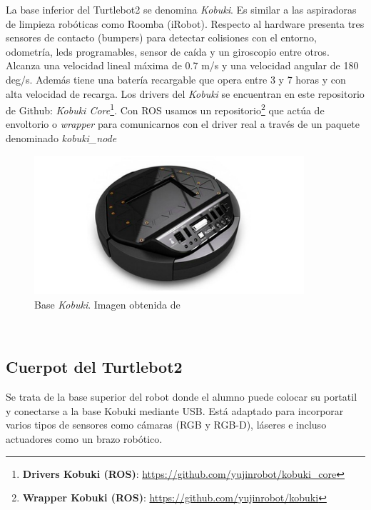 La base inferior del Turtlebot2 se denomina \textit{Kobuki}. Es similar a las aspiradoras de limpieza robóticas como Roomba (iRobot). Respecto al hardware presenta tres sensores de contacto (bumpers) para detectar colisiones con el entorno, odometría, leds programables, sensor de caída y un giroscopio entre otros. Alcanza una velocidad lineal máxima de 0.7 m/s y una velocidad angular de 180 deg/s. Además tiene una batería recargable que opera entre 3 y 7 horas y con alta velocidad de recarga. Los drivers del \textit{Kobuki} se encuentran en este repositorio de Github: \textit{Kobuki Core}\footnote{\textbf{Drivers Kobuki (ROS)}: \url{https://github.com/yujinrobot/kobuki_core}}. Con ROS usamos un repositorio\footnote{\textbf{Wrapper Kobuki (ROS)}: \url{https://github.com/yujinrobot/kobuki}} que actúa de envoltorio o \textit{wrapper} para comunicarnos con el driver real a través de un paquete denominado \textit{kobuki\_node}
\begin{figure} [H]
	\begin{center}
	\includegraphics[width=10cm]{imagenes/cap3/base-kobuki.png}
	\end{center}
	\caption[Base Kobuki]{Base \textit{Kobuki}. Imagen obtenida de \cite{kobuki}}
	\label{fig:kobuki_real}
\end{figure}\

\subsection{Cuerpot del Turtlebot2}
\label{subsec:turtlebot2_cuerpo}

Se trata de la base superior del robot donde el alumno puede colocar su portatil y conectarse a la base Kobuki mediante USB. Está adaptado para incorporar varios tipos de sensores como cámaras (RGB y RGB-D), láseres e incluso actuadores como un brazo robótico.

